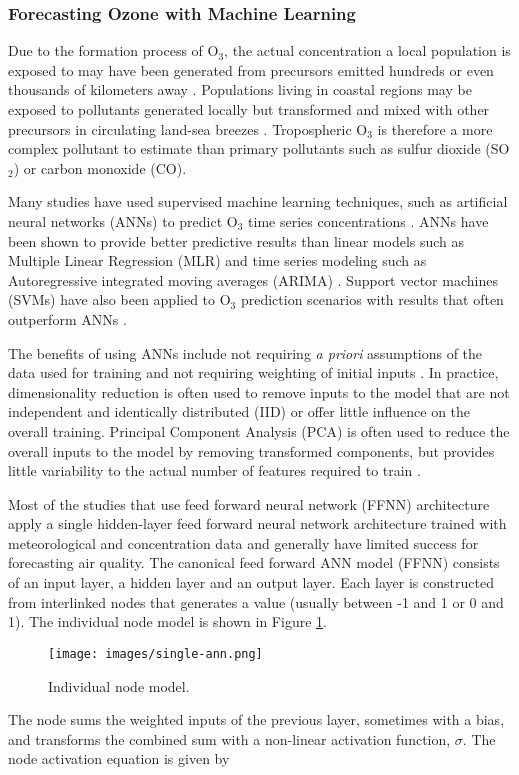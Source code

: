 \subsubsection{Forecasting Ozone with Machine Learning}

Due to the formation process of O$_{3}$, the actual concentration a local population is exposed to may have been generated from precursors emitted hundreds or even thousands of kilometers away \citep{Glavas2011}. Populations living in coastal regions may be exposed to pollutants generated locally but transformed and mixed with other precursors in circulating land-sea breezes \citep{Freeman2017a}. Tropospheric O$_{3}$ is therefore a more complex pollutant to estimate than primary pollutants such as sulfur dioxide (SO$_{2}$) or carbon monoxide (CO).

Many studies have used supervised machine learning techniques, such as artificial neural networks (ANNs) to predict O$_{3}$ time series concentrations \citep{Comrie1997, Dorling2003, Ettouney2009a, Kurt2008, Biancofiore2017}. ANNs have been shown to provide better predictive results than linear models such as Multiple Linear Regression (MLR) and time series modeling such as Autoregressive integrated moving averages (ARIMA) \citep{Gardner1998, Prybutok2000}. Support vector machines (SVMs) have also been applied to O$_{3}$ prediction scenarios with results that often outperform ANNs \citep{Luna2014, Papaleondias2013, Singh2013}. 

The benefits of using ANNs include not requiring \textit{a priori} assumptions of the data used for training and not requiring weighting of initial inputs \citep{Gardner1998}. In practice, dimensionality reduction is often used to remove inputs to the model that are not independent and identically distributed (IID) or offer little influence on the overall training. Principal Component Analysis (PCA) is often used to reduce the overall inputs to the model by removing transformed components, but provides little variability to the actual number of features required to train \citep{Singh2013, Wang2015a}.

Most of the studies that use feed forward  neural network (FFNN) architecture apply a single hidden-layer feed forward neural network architecture trained with meteorological and concentration data and generally have limited success for forecasting air quality. The canonical feed forward ANN model (FFNN) consists of an input layer, a hidden layer and an output layer. Each layer is constructed from interlinked nodes that generates a value (usually between -1 and 1 or 0 and 1). The individual node model is shown in Figure \ref{fig:SingleANN}. \\
%
\begin{figure}[H]
\centering
\texttt{[image: images/single-ann.png]} 
\caption{Individual node model.}
\label{fig:SingleANN}
\end{figure}
%
The node sums the weighted inputs of the previous layer, sometimes with a bias, and transforms the combined sum with a non-linear activation function, $\sigma$. The node activation equation is given by

